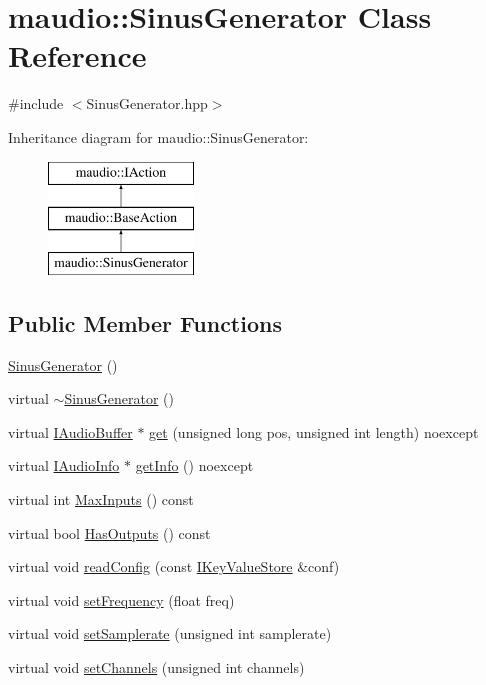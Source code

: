 \hypertarget{classmaudio_1_1SinusGenerator}{\section{maudio\-:\-:Sinus\-Generator Class Reference}
\label{classmaudio_1_1SinusGenerator}
}


{\ttfamily \#include $<$Sinus\-Generator.\-hpp$>$}

Inheritance diagram for maudio\-:\-:Sinus\-Generator\-:\begin{figure}[H]
\begin{center}
\leavevmode
\includegraphics[height=3.000000cm]{classmaudio_1_1SinusGenerator}
\end{center}
\end{figure}
\subsection*{Public Member Functions}
\begin{DoxyCompactItemize}
\item 
\hyperlink{classmaudio_1_1SinusGenerator_a2a6f8d9cbb43ae177e50ba5e64e53a3c}{Sinus\-Generator} ()
\item 
virtual \hyperlink{classmaudio_1_1SinusGenerator_aed11cbd52f1ee60ef9819478182b58e4}{$\sim$\-Sinus\-Generator} ()
\item 
virtual \hyperlink{classmaudio_1_1IAudioBuffer}{I\-Audio\-Buffer} $\ast$ \hyperlink{classmaudio_1_1SinusGenerator_a461fdc87ced846928ea651173122713a}{get} (unsigned long pos, unsigned int length) noexcept
\item 
virtual \hyperlink{classmaudio_1_1IAudioInfo}{I\-Audio\-Info} $\ast$ \hyperlink{classmaudio_1_1SinusGenerator_ab3ac1d0f6d84658262026bbebcbd808f}{get\-Info} () noexcept
\item 
virtual int \hyperlink{classmaudio_1_1SinusGenerator_aee038f2dd2415a96ce1902be978f4ad4}{Max\-Inputs} () const 
\item 
virtual bool \hyperlink{classmaudio_1_1SinusGenerator_a0e39f15f11221f97fb034a42df608889}{Has\-Outputs} () const 
\item 
virtual void \hyperlink{classmaudio_1_1SinusGenerator_a9a901592dba8df35ac74ddd85cbb1482}{read\-Config} (const \hyperlink{classmaudio_1_1IKeyValueStore}{I\-Key\-Value\-Store} \&conf)
\item 
virtual void \hyperlink{classmaudio_1_1SinusGenerator_a7957a8e22bbda999d99cb5dc954a6979}{set\-Frequency} (float freq)
\item 
virtual void \hyperlink{classmaudio_1_1SinusGenerator_a5b75c779c1a8f249e70a442d591e7b41}{set\-Samplerate} (unsigned int samplerate)
\item 
virtual void \hyperlink{classmaudio_1_1SinusGenerator_a13aa66a1d01fec78d92c9b05c1d111d7}{set\-Channels} (unsigned int channels)
\end{DoxyCompactItemize}
